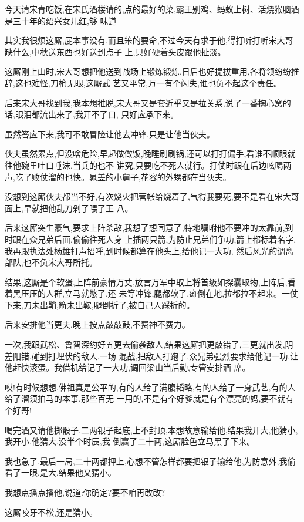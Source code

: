 ﻿\documentclass[12pt]{article}
\begin{document}
今天请宋青吃饭,在宋氏酒楼请的,点的最好的菜,霸王别鸡、蚂蚁上树、活烧猴脑\dldots 酒是三十年的绍兴女儿红,够
味道

其实我很烦这厮,屁本事没有,而且笨的要命,不过今天有求于他,得打听打听宋大哥缺什么,中秋送东西也好送到点子
上,只好硬着头皮跟他扯淡。

这厮刚上山时,宋大哥想把他送到战场上锻炼锻炼,日后也好提拔重用,各将领纷纷推辞,这也难怪,刀枪无眼,这厮武
艺又平常,万一有个闪失,谁也负不起这个责任。

后来宋大哥找到我,我本想推脱,宋大哥又是套近乎又是拉关系,说了一番掏心窝的话,眼泪都流出来了,我开不了口,
只好应承下来。

虽然答应下来,我可不敢冒险让他去冲锋,只是让他当伙夫。

伙夫虽然累点,但没啥危险,早起做做饭,晚睡刷刷锅,还可以打打偏手,看谁不顺眼就往他碗里吐口唾沫,当兵的也不
讲究,只要吃不死人就行。打仗时跟在后边吆喝两声,吃了败仗溜的也快。晁盖的小舅子,花容的外甥都在当伙夫。

没想到这厮伙夫都当不好,有次烧火把营帐给烧着了,气得我要死,要不是看在宋大哥面上,早就把他乱刀剁了喂了王
八。

后来这厮突生豪气,要求上阵杀敌,我想了想同意了,特地嘱咐他不要冲的太靠前,到时跟在众兄弟后面,偷偷往死人身
上插两只箭,为防止兄弟们争功,箭上都标着名字,我再跟执法处杨雄打声招呼,到时候都算在他头上,给他记一大功,
然后风光的调离部队,也不负宋大哥所托。

结果,这厮是个软蛋,上阵前豪情万丈,放言万军中取上将首级如探囊取物,上阵后,看着黑压压的人群,立马就憋了,还
未等冲锋,腿都软了,瘫倒在地,拉都拉不起来。一仗下来,刀未出鞘,箭未出鞍,腿倒折了,被自己人踩折的。

后来安排他当更夫,晚上按点敲敲鼓,不费神不费力。

一次,我跟武松、鲁智深约好五更去偷袭敌人,结果这厮把更敲错了,三更就出发,阴差阳错,碰到打埋伏的敌人,一场
混战,把敌人打跑了,众兄弟强烈要求给他记一功,让他赶快滚蛋。我借机给记了一大功,调回梁山当后勤,专管安排酒
席。

哎!有时候想想,佛祖真是公平的,有的人给了满腹韬略,有的人给了一身武艺,有的人给了溜须拍马的本事,那些百无
一用的,不是有个好爹就是有个漂亮的妈,要不就有个好哥!

喝完酒又请他掷骰子,二两银子起底,上不封顶,本想故意输给他,结果我开大,他猜小,我开小,他猜大,没半个时辰,我
倒赢了二十两,这厮脸色立马黑了下来。

我也急了,最后一局,二十两都押上,心想不管怎样都要把银子输给他,为防意外,我偷看了一眼,是大,结果他又猜小。

我想点播点播他,说道:你确定?要不咱再改改?

这厮咬牙不松,还是猜小。
\end{document}

